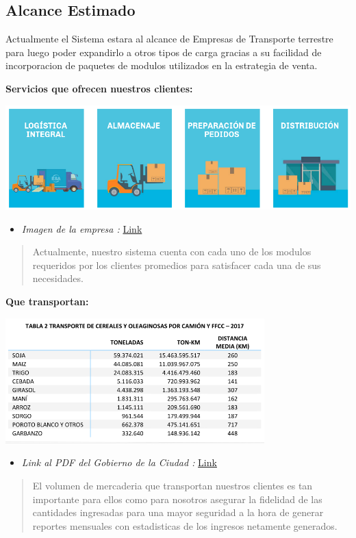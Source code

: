 \documentclass[
10pt, %
a4paper, %
oneside, %
headinclude,footinclude, %
BCOR5mm, %
]{scrartcl}
\begin{document}
\subsection{Alcance Estimado}
  Actualmente el Sistema estara al alcance de Empresas de Transporte terrestre
  para luego poder expandirlo a otros tipos de carga gracias a su facilidad de
  incorporacion de paquetes de modulos utilizados en la estrategia de venta.

\pagebreak

 \textbf{Servicios que ofrecen nuestros clientes:}
 \begin{flushleft}
     \includegraphics[width=14cm, keepaspectratio]{images/services.png}
 \end{flushleft}
  \begin{itemize}
    \item \textit{Imagen de la empresa :}
      \href{http://www.esalogistica.com.ar/index.html#quehacemos} {Link}
  \end{itemize}
  \begin{quotation}
    Actualmente, nuestro sistema cuenta con cada uno de los modulos requeridos
    por los clientes promedios para satisfacer cada una de sus necesidades.
  \end{quotation}
 \textbf{Que transportan:}
 \begin{flushleft}
     \includegraphics[width=10cm, keepaspectratio]{images/loads.png}
 \end{flushleft}
  \begin{itemize}
    \item \textit{Link al PDF del Gobierno de la Ciudad :}
      \href{https://www.argentina.gob.ar/sites/default/files/transporte_terrestre_de_cereales_y_oleaginosas_2017_v1.pdf} {Link}
  \end{itemize}
  \begin{quotation}
    El volumen de mercaderia que transportan nuestros clientes es tan
    importante para ellos como para nosotros asegurar la fidelidad de las
    cantidades ingresadas para una mayor seguridad a la hora de generar
    reportes mensuales con estadisticas de los ingresos netamente generados.
  \end{quotation}
\end{document}
